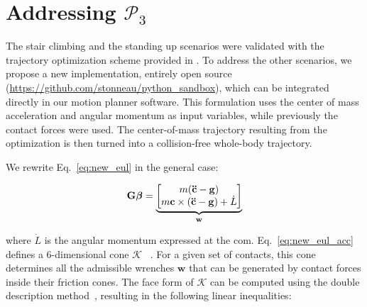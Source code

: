 \section{Addressing $\mathcal{P}_3$}
\label{app:optim}
The stair climbing and the standing up scenarios were validated with the trajectory optimization scheme provided in \citeauthor{Carpentier2016}. 
To address the other scenarios, we propose a new implementation, entirely open source (\url{https://github.com/stonneau/python_sandbox}), which can be integrated directly in our motion planner software. This formulation uses the center of mass acceleration and angular momentum as input variables, while previously the contact forces were used.
The center-of-mass trajectory resulting from the optimization is then turned into a collision-free whole-body trajectory.

We rewrite Eq.~\ref{eq:new_eul} in the general case:


\begin{align} \label{eq:new_eul_acc}
\mathbf{G} \bm{\beta} = 
\underbrace{\begin{bmatrix}m (\mathbf{\ddot{c}} - \mathbf{g}) \\m \mathbf{c} \times (\mathbf{\ddot{c}} - \mathbf{g}) + \dot{L}\end{bmatrix}}_{\mathbf{w}}
\end{align}

where $\dot{L}$ is the angular momentum expressed at the com.
Eq.~\ref{eq:new_eul_acc} defines a 6-dimensional cone $\mathcal{K}$ ~\citep{qiu:dhm:2011,Caron2015}. For a given set of contacts,
this cone determines all the admissible wrenches $\mathbf{w}$ that can be generated by contact forces inside their friction cones.
The face form of $\mathcal{K}$ can be computed using the double description method~\citep{Fukuda1996}, resulting in the following linear inequalities:

